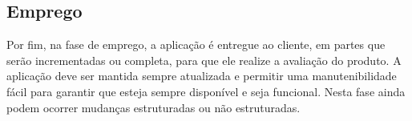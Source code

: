 \subsection{Emprego}
\label{sec-ref-emprego}

Por fim, na fase de emprego, a aplicação é entregue ao cliente, em partes que serão incrementadas ou completa, para que ele realize a avaliação do produto. A aplicação deve ser mantida sempre atualizada e permitir uma manutenibilidade fácil para garantir que esteja sempre disponível e seja funcional. Nesta fase ainda podem ocorrer mudanças estruturadas ou não estruturadas.              





       